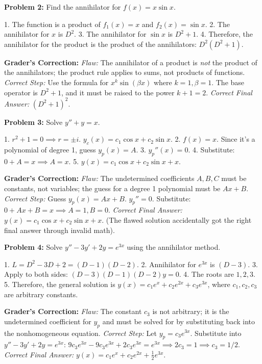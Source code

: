 \documentclass[11pt]{article}
\begin{document}
\vspace{0.5cm}
\textbf{Problem 2:} Find the annihilator for $f(x) = x \sin x$.
\begin{tcolorbox}[colback=red!5,colframe=red!40!black,title=Flawed Solution]
1. The function is a product of $f_1(x) = x$ and $f_2(x) = \sin x$.
2. The annihilator for $x$ is $D^2$.
3. The annihilator for $\sin x$ is $D^2 + 1$.
4. Therefore, the annihilator for the product is the product of the annihilators: $D^2(D^2 + 1)$.
\end{tcolorbox}
\textbf{Grader's Correction:}
\textit{Flaw:} The annihilator of a product is \textit{not} the product of the annihilators; the product rule applies to sums, not products of functions.
\textit{Correct Step:} Use the formula for $x^k \sin(\beta x)$ where $k=1, \beta=1$. The base operator is $D^2 + 1$, and it must be raised to the power $k+1 = 2$.
\textit{Correct Final Answer:} $(D^2 + 1)^2$.

\vspace{0.5cm}
\textbf{Problem 3:} Solve $y'' + y = x$.
\begin{tcolorbox}[colback=red!5,colframe=red!40!black,title=Flawed Solution]
1. $r^2 + 1 = 0 \implies r = \pm i$. $y_c(x) = c_1 \cos x + c_2 \sin x$.
2. $f(x) = x$. Since it's a polynomial of degree 1, guess $y_p(x) = A$.
3. $y_p''(x) = 0$.
4. Substitute: $0 + A = x \implies A = x$.
5. $y(x) = c_1 \cos x + c_2 \sin x + x$.
\end{tcolorbox}
\textbf{Grader's Correction:}
\textit{Flaw:} The undetermined coefficients $A, B, C$ must be constants, not variables; the guess for a degree 1 polynomial must be $Ax + B$.
\textit{Correct Step:} Guess $y_p(x) = Ax + B$. $y_p'' = 0$. Substitute: $0 + Ax + B = x \implies A=1, B=0$.
\textit{Correct Final Answer:} $y(x) = c_1 \cos x + c_2 \sin x + x$. (The flawed solution accidentally got the right final answer through invalid math).

\vspace{0.5cm}
\textbf{Problem 4:} Solve $y'' - 3y' + 2y = e^{3x}$ using the annihilator method.
\begin{tcolorbox}[colback=red!5,colframe=red!40!black,title=Flawed Solution]
1. $L = D^2 - 3D + 2 = (D-1)(D-2)$.
2. Annihilator for $e^{3x}$ is $(D-3)$.
3. Apply to both sides: $(D-3)(D-1)(D-2)y = 0$.
4. The roots are $1, 2, 3$.
5. Therefore, the general solution is $y(x) = c_1 e^x + c_2 e^{2x} + c_3 e^{3x}$, where $c_1, c_2, c_3$ are arbitrary constants.
\end{tcolorbox}
\textbf{Grader's Correction:}
\textit{Flaw:} The constant $c_3$ is not arbitrary; it is the undetermined coefficient for $y_p$ and must be solved for by substituting back into the nonhomogeneous equation.
\textit{Correct Step:} Let $y_p = c_3 e^{3x}$. Substitute into $y'' - 3y' + 2y = e^{3x}$: $9c_3 e^{3x} - 9c_3 e^{3x} + 2c_3 e^{3x} = e^{3x} \implies 2c_3 = 1 \implies c_3 = 1/2$.
\textit{Correct Final Answer:} $y(x) = c_1 e^x + c_2 e^{2x} + \frac{1}{2} e^{3x}$.
\end{document}
